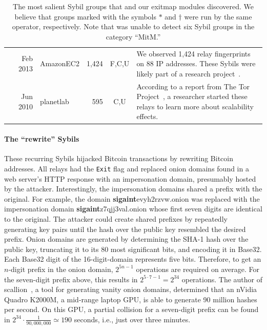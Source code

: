 \begin{table}[ht!]
\begin{tabularx}{\textwidth}{l r l r c X}
& Feb 2013 & AmazonEC2 & 1,424 & \phantom{N,}F,C,U\phantom{,E} & We observed 1,424 relay fingerprints on
88 IP addresses.  These Sybils were likely part of a research
project~\cite[\S~V]{Biryukov2013a}. \\

& Jun 2010 & planetlab & 595 & \phantom{N,F,}C,U\phantom{,E} & According to a report from The Tor
Project~\cite{progressreport}, a researcher started these relays to learn more
about scalability effects. \\

\bottomrule

\end{tabularx}
\caption{The most salient Sybil groups that \sys and our exitmap modules
	discovered.  We believe that groups marked with the symbols $*$ and
	$\dagger$ were run by the same operator, respectively.  Note that \sys was
	unable to detect six Sybil groups in the category ``MitM.''}
\label{tab:sybils}
\end{table}

\paragraph{The ``rewrite'' Sybils}
These recurring Sybils hijacked Bitcoin transactions by rewriting Bitcoin
addresses.  All relays had the \texttt{Exit} flag and replaced onion domains
found in a web server's HTTP response with an impersonation domain, presumably
hosted by the attacker.  Interestingly, the impersonation domains shared a
prefix with the original.  For example, the domain
\textbf{sigaint}evyh2rzvw.onion was replaced with the impersonation domain
\textbf{sigaint}z7qjj3val.onion whose first seven digits are identical to the
original.  The attacker could create shared prefixes by repeatedly generating
key pairs until the hash over the public key resembled the desired prefix.
Onion domains are generated by determining the SHA-1 hash over the public key,
truncating it to its 80 most significant bits, and encoding it in Base32.  Each
Base32 digit of the 16-digit-domain represents five bits.  Therefore, to get an
$n$-digit prefix in the onion domain, $2^{5 n - 1}$ operations are required on
average.  For the seven-digit prefix above, this results in $2^{5 \cdot 7 - 1}
= 2^{34}$ operations.  The author of scallion~\cite{scallion}, a tool for
generating vanity onion domains, determined that an nVidia Quadro K2000M, a
mid-range laptop GPU, is able to generate 90 million hashes per second.  On
this GPU, a partial collision for a seven-digit prefix can be found in $2^{34}
\cdot \frac{1}{90,000,000} \simeq 190$ seconds, i.e., just over three minutes.


